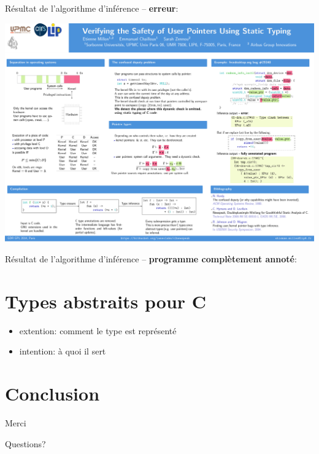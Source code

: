 \documentclass{beamer}
\def\codeout#1{
    \begin{center}
    \fboxsep=2mm
    \colorbox{codeoutcol}{\BUseVerbatim{#1}}
    \end{center}
}
\begin{document}
\begin{frame}[fragile]

Résultat de l'algorithme d'inférence -- \textbf{erreur}:

\codeout{drmko}
\end{frame}

\begin{frame}
    \includegraphics[trim=2300 990 100 1220,clip,width=\textwidth]{poster.pdf}
\end{frame}

\begin{frame}[fragile]


Résultat de l'algorithme d'inférence -- \textbf{programme complètement annoté}:

\codeout{drmok}
\end{frame}

\section{Types abstraits pour C}

\begin{frame}
    \begin{itemize}
        \item extention: comment le type est représenté
        \item intention: à quoi il sert
    \end{itemize}
\end{frame}

\section{Conclusion}

\begin{frame}
    Merci

    Questions?
\end{frame}
\end{document}
